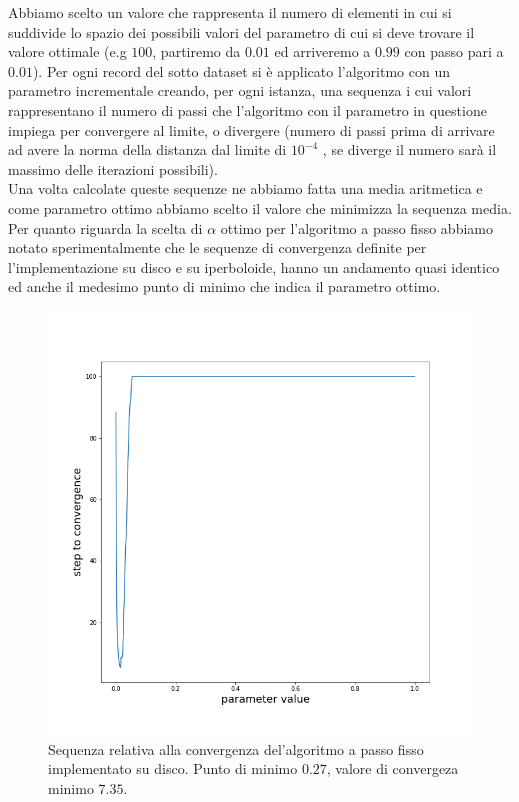 \documentclass[a4paper, 12pt]{article}
\begin{document}
Abbiamo scelto un valore che rappresenta il numero di elementi in cui si suddivide lo spazio dei possibili valori del parametro di cui si deve trovare  il valore ottimale (e.g $100$, partiremo da $0.01$ ed arriveremo a $0.99$ con passo pari a $0.01$).
Per ogni record del sotto dataset si è applicato l'algoritmo con un parametro incrementale creando, per ogni istanza, una sequenza i cui valori rappresentano il numero di passi che l'algoritmo con il parametro in questione impiega per convergere al limite, o divergere (numero di passi prima di arrivare ad avere la norma della distanza dal limite di $10^{-4}$ , se diverge il numero sarà il massimo delle iterazioni possibili).\\
Una volta calcolate queste sequenze ne abbiamo fatta una media aritmetica e come parametro ottimo abbiamo scelto il valore che minimizza la sequenza media.\\
Per quanto riguarda la scelta di $\alpha$ ottimo per l'algoritmo a passo fisso abbiamo notato sperimentalmente che le sequenze di convergenza definite per l'implementazione su disco e su iperboloide, hanno un andamento quasi identico ed anche il medesimo punto di minimo che indica il parametro ottimo.\\
\begin{figure}[H] %
    \centering\includegraphics[width=1\textwidth]{fixed_step_parameter_poincare.png}
    \caption{Sequenza relativa alla convergenza del'algoritmo a passo fisso implementato su disco. Punto di minimo $0.27$, valore di convergeza minimo $7.35$.}
\end{figure}
\end{document}
